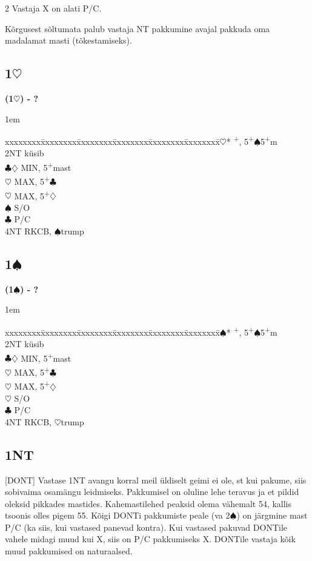 \documentclass[10pt]{article}
\renewcommand{\c}{$\clubsuit$}
\renewcommand{\d}{$\diamondsuit$}
\newcommand{\h}{$\heartsuit$}
\newcommand{\s}{$\spadesuit$}
\newcommand{\p}{\textsuperscript{+}}
\newenvironment{bidtable}[1][]
{\textbf{#1}
  \begin{adjustwidth}{1em}{}
    \addvspace{2pt}
    \begin{tabbing}
      xxxxxxxx\=xxxxxxxx\=xxxxxxxx\=xxxxxxxx\=xxxxxxxx\=xxxxxxxx\=\kill}
{\end{tabbing}\end{adjustwidth}\bigskip}%
\newcommand{\pdfh}{\texorpdfstring{\h{}}{H}}
\newcommand{\pdfs}{\texorpdfstring{\s{}}{S}}
\begin{document}
\begin{multicols*}{2}
Vastaja X on alati P/C.

Kõrgusest sõltumata palub vastaja NT pakkumine avajal pakkuda oma madalamat masti (tõkestamiseks).

\subsection{1\pdfh}

\begin{bidtable}[(1\h) - ?]
2\h* {}\p, 5\p\s 5\p m             \\
     \> 2NT \> küsib                  \\
     \>     \c\d \> MIN, 5\p mast \\
     \>     \h   \> MAX, 5\p\c    \\
     \>     \h   \> MAX, 5\p\d    \\
     \s \> S/O                    \\
     \c \> P/C                    \\
     \> 4NT \> RKCB, \s trump
\end{bidtable}
\subsection{1\pdfs}

\begin{bidtable}[(1\s) - ?]
2\s* {}\p, 5\p\s 5\p m             \\
     \> 2NT \> küsib                  \\
     \>     \c\d \> MIN, 5\p mast \\
     \>     \h   \> MAX, 5\p\c    \\
     \>     \h   \> MAX, 5\p\d    \\
     \h \> S/O                    \\
     \c \> P/C                    \\
     \> 4NT \> RKCB, \h trump
\end{bidtable}
\subsection{1NT}

[DONT] Vastase 1NT avangu korral meil üldiselt geimi ei ole, st kui pakume, siis
sobivaima osamängu leidmiseks. Pakkumisel on oluline lehe teravus ja et pildid
oleksid pikkades mastides. Kahemastilehed peaksid olema vähemalt 54, kallis
tsoonis olles pigem 55. Kõigi DONTi pakkumiste peale (va 2\s ) on järgmine mast
P/C (ka siis, kui vastased panevad kontra). Kui vastased pakuvad DONTile vahele
midagi muud kui X, siis on P/C pakkumiseks X. DONTile vastaja kõik muud
pakkumised on naturaalsed.


\end{multicols*}
\end{document}
